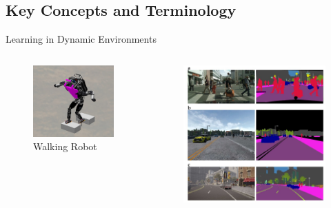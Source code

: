\documentclass[xcolor=dvipsnames]{beamer}
\begin{document}
\subsection{Key Concepts and Terminology}
\begin{frame}{Learning in Dynamic Environments}
    \begin{columns}
        \begin{column}{0.5\textwidth}
            \begin{figure}
                \centering
                \includegraphics[height=0.8\textwidth]{atlas.jpg}
                \caption{Walking Robot \cite{wiedebach_walking_2016}}
                \label{fig:walking-robot}
            \end{figure}
        \end{column}
        \begin{column}{0.5\textwidth}
            \begin{figure}
                \centering
                \includegraphics[height=0.8\textwidth]{tesla.jpg}

\end{figure}
\end{column}
\end{columns}
\end{frame}
\end{document}
